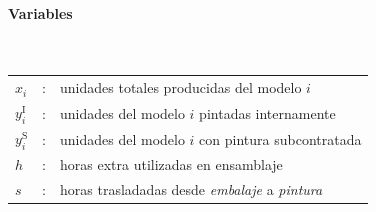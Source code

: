 




\paragraph{Variables}\mbox{}\\
\begin{tabular}{lcl}
$x_i$ & : & unidades totales producidas del modelo $i$ \\
$y_i^{\mathrm{I}}$ & : & unidades del modelo $i$ pintadas internamente \\
$y_i^{\mathrm{S}}$ & : & unidades del modelo $i$ con pintura subcontratada \\
$h$      & : & horas extra utilizadas en ensamblaje \\
$s$      & : & horas trasladadas desde \emph{embalaje} a \emph{pintura} \\
\end{tabular}

